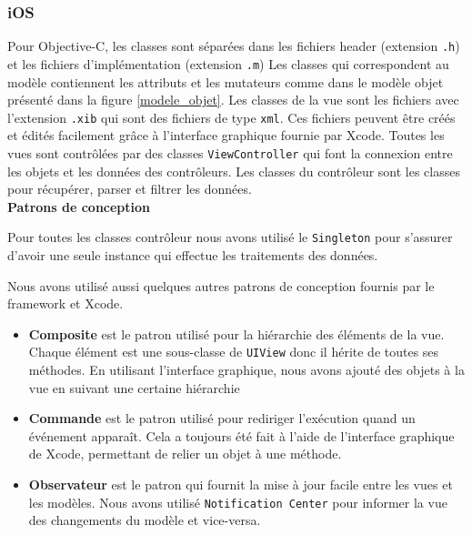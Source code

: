 \documentclass[a4paper, 11px]{article}
\begin{document}
\subsubsection{iOS}
Pour Objective-C, les classes sont séparées dans les fichiers header (extension \texttt{.h}) et les fichiers d'implémentation (extension \texttt{.m})
Les classes qui correspondent au modèle contiennent les attributs et les mutateurs comme dans le modèle objet présenté dans la figure \ref{modele_objet}. Les classes de la vue sont les fichiers avec l'extension \texttt{.xib} qui sont des fichiers de type \texttt{xml}. Ces fichiers peuvent être créés et édités facilement grâce à l'interface graphique fournie par Xcode. Toutes les vues sont contrôlées par des classes \texttt{ViewController} qui font la connexion entre les objets et les données des contrôleurs.
Les classes du contrôleur sont les classes pour récupérer, parser et filtrer les données.\\

{\bf Patrons de conception}

Pour toutes les classes contrôleur nous avons utilisé le \texttt{Singleton} pour s'assurer d'avoir une seule instance qui effectue les traitements des données.


Nous avons utilisé aussi quelques autres patrons de conception fournis par le framework et Xcode. \\
\begin{itemize}
	\item {\bf Composite} est le patron utilisé pour la hiérarchie des éléments de la vue. Chaque élément est une sous-classe de \texttt{UIView} donc il hérite de toutes ses méthodes.
En utilisant l'interface graphique, nous avons ajouté des objets à la vue en suivant une certaine hiérarchie\\
	\item {\bf Commande} est le patron utilisé pour rediriger l'exécution quand un événement apparaît. Cela a toujours été fait à l'aide de l'interface graphique de Xcode, permettant de relier un objet à une méthode.\\
	\item {\bf Observateur} est le patron qui fournit la mise à jour facile entre les vues et les modèles. Nous avons utilisé \texttt{Notification Center} pour informer la vue des changements du modèle et vice-versa.
\end{itemize}
\end{document}
